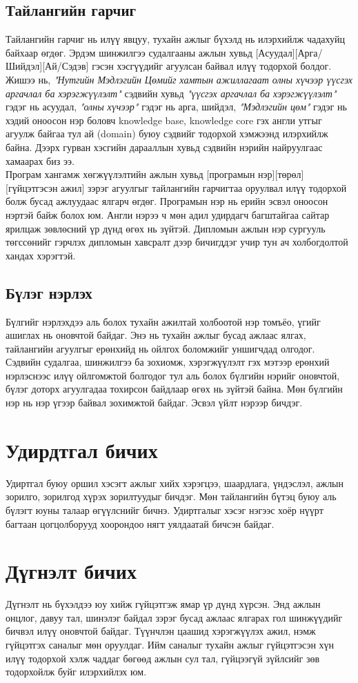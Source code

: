 \subsection{Тайлангийн гарчиг}
Тайлангийн гарчиг нь илүү явцуу, тухайн ажлыг бүхэлд нь илэрхийлж чадахуйц байхаар өгдөг. Эрдэм шинжилгээ судалгааны ажлын хувьд [Асуудал][Арга/Шийдэл][Ай/Сэдэв] гэсэн хэсгүүдийг агуулсан байвал илүү тодорхой болдог. Жишээ нь, \textit{"Нутгийн Мэдлэгийн Цөмийг хамтын ажиллагаат олны хүчээр үүсгэх аргачлал ба хэрэгжүүлэлт"} сэдвийн хувьд \textit{"үүсгэх аргачлал ба хэрэгжүүлэлт"} гэдэг нь асуудал, \textit{"олны хүчээр"} гэдэг нь арга, шийдэл, \textit{"Мэдлэгийн цөм"} гэдэг нь хэдий оноосон нэр боловч knowledge base, knowledge core гэх англи утгыг агуулж байгаа тул ай (domain) буюу сэдвийг тодорхой хэмжээнд илэрхийлж байна. Дээрх гурван хэсгийн дарааллын хувьд сэдвийн нэрийн найруулгаас хамаарах биз ээ.
\\Програм хангамж хөгжүүлэлтийн ажлын хувьд [програмын нэр][төрөл][гүйцэтгэсэн ажил] зэрэг агуулгыг тайлангийн гарчигтаа оруулвал илүү тодорхой болж бусад ажлуудаас ялгарч өгдөг. Програмын нэр нь ерийн эсвэл оноосон нэртэй байж болох юм. 
Англи нэрээ ч мөн адил удирдагч багштайгаа сайтар ярилцаж зөвлөсний үр дүнд өгөх нь зүйтэй. Дипломын ажлын нэр сургууль төгссөнийг гэрчлэх дипломын хавсралт дээр бичигддэг учир тун ач холбогдолтой хандах хэрэгтэй.

\subsection{Бүлэг нэрлэх}
Бүлгийг нэрлэхдээ аль болох тухайн ажилтай холбоотой нэр томъёо, үгийг ашиглах нь оновчтой байдаг. Энэ нь тухайн ажлыг бусад ажлаас ялгах, тайлангийн агуулгыг ерөнхийд нь ойлгох боломжийг уншигчдад олгодог. Сэдвийн судалгаа, шинжилгээ ба зохиомж, хэрэгжүүлэлт гэх мэтээр ерөнхий нэрлэснээс илүү ойлгомжтой болгодог тул аль болох бүлгийн нэрийг оновчтой, бүлэг доторх агуулгадаа тохирсон байдлаар өгөх нь зүйтэй байна. Мөн бүлгийн нэр нь нэр үгээр байвал зохимжтой байдаг. Эсвэл үйлт нэрээр бичдэг.

\section{Удирдтгал бичих}
Удиртгал буюу оршил хэсэгт ажлыг хийх хэрэгцээ, шаардлага, үндэслэл, ажлын зорилго, зорилгод хүрэх зорилтуудыг бичдэг. Мөн тайлангийн бүтэц буюу аль бүлэгт юуны талаар өгүүлснийг бичнэ. Удиртгалыг хэсэг нэгээс хоёр нүүрт багтаан цогцолборууд хоорондоо нягт уялдаатай бичсэн байдаг.

\section{Дүгнэлт бичих}
Дүгнэлт нь бүхэлдээ юу хийж гүйцэтгэж ямар үр дүнд хүрсэн. Энд ажлын онцлог, давуу тал, шинэлэг байдал зэрэг бусад ажлаас ялгарах гол шинжүүдийг бичвэл илүү оновчтой байдаг. Түүнчлэн цаашид хэрэгжүүлэх ажил, нэмж гүйцэтгэх саналыг мөн оруулдаг. Ийм саналыг тухайн ажлыг гүйцэтгэсэн хүн илүү тодорхой хэлж чаддаг бөгөөд ажлын сул тал, гүйцээгүй зүйлсийг зөв тодорхойлж буйг илэрхийлэх юм.